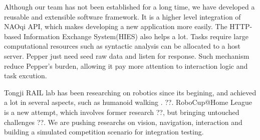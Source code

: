 Although our team has not been established for a long time, we have developed a reusable and extensible software framework. 
It is a higher level integration of NAOqi API, which makes developing a new application more easily. 
The HTTP-based Information Exchange System(HIES) also helps a lot. 
Tasks require large computational resources such as syntactic analysis can be allocated to a host server. 
Pepper just need seed raw data and listen for response. Such mechanism reduce Pepper’s burden, allowing it pay more attention to interaction logic and task excution. 

Tongji RAIL lab has been researching on robotics since its begining, and achieved a lot in several aspects, such as humanoid walking \cite{rebalancecontrol}. ??. 
RoboCup@Home League is a new attempt, which involves former research ??, but bringing untouched challenges ??. 
We are pushing researchs on vision, navigation, interaction and building a simulated competition scenario for integration testing.
